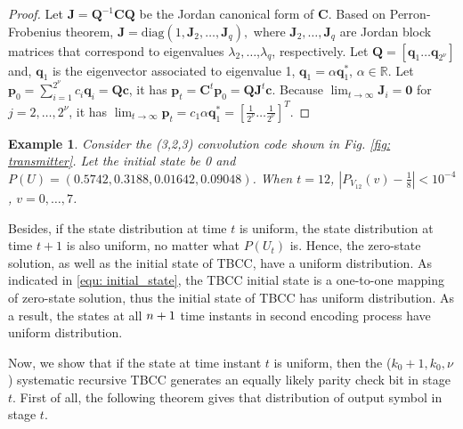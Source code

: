 \documentclass [PhD] {uclathes}
\newtheorem{example}{Example}
\begin{document}
\begin{proof}
    Let $\mathbf{J}=\mathbf{Q}^{-1}\mathbf{C}\mathbf{Q}$ be the  Jordan canonical form   of $\mathbf{C}$. Based on Perron-Frobenius theorem,
    $\mathbf{J}=\text{diag}(1,\mathbf{J}_2,\dots,\mathbf{J}_q),$
    where $\mathbf{J}_2,\ldots,\mathbf{J}_q$ are Jordan block matrices that correspond to eigenvalues $\lambda_2,\ldots$,$\lambda_q$, respectively.
    Let $\mathbf{Q}=[\mathbf{q}_1\dots\mathbf{q}_{2^\nu}]$ and, $\mathbf{q}_1$ is the eigenvector associated to eigenvalue 1, $\mathbf{q}_1= \alpha\mathbf{q}_1^*$, $\alpha\in\mathbb{R}$.
    Let $\mathbf{p}_0=\sum_{i=1}^{2^\nu}c_i\mathbf{q}_i=\mathbf{Q}\mathbf{c}$, it has $\mathbf{p}_t=\mathbf{C}^t\mathbf{p}_0=\mathbf{Q}\mathbf{J}^t\mathbf{c}$.
    Because
    $\lim_{t\rightarrow \infty}\mathbf{J}_i=\mathbf{0}$ for $j=2,\ldots, 2^{\nu}$, it has $\lim_{t\rightarrow \infty} \mathbf{p}_t = c_1\alpha\mathbf{q}_1^* =\left[\frac{1}{2^\nu}\dots \frac{1}{2^\nu}\right]^T$.
\end{proof}

\begin{example}
    Consider the (3,2,3) convolution code shown in Fig. \ref{fig: transmitter}. Let the initial state be 0 and $P(U)=(0.5742,0.3188, 0.01642,0.09048)$.  When $t=12$, $|P_{V_{12}}(v)-\frac{1}{8}|<10^{-4}$, $v=0,\ldots,7$.
\end{example}

Besides, if the state distribution at time $t$ is  uniform, the state distribution at time $t+1$ is also uniform, no matter what $P(U_t)$ is. Hence, the zero-state solution, as well as the initial state of TBCC,  have a uniform distribution.
As indicated in \eqref{equ: initial_state}, the TBCC initial state is a one-to-one mapping of zero-state solution, thus the initial state of TBCC  has uniform distribution. 
As a result, the states at all $n+1$ time instants in second encoding process have uniform distribution.


Now, we show that if the state at time instant $t$ is uniform, then the ($k_0+1,k_0,\nu$) systematic recursive TBCC generates an equally likely parity check bit in stage $t$. First of all, the following theorem gives that distribution of output symbol in stage $t$.
\end{document}
